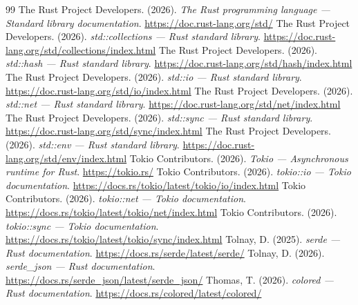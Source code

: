 \documentclass[11pt]{article}
\begin{document}
\renewcommand{\refname}{Referencias}
\begin{thebibliography}{99}
The Rust Project Developers. (2026). \textit{The Rust programming language --- Standard library documentation}. \url{https://doc.rust-lang.org/std/}
The Rust Project Developers. (2026). \textit{std::collections --- Rust standard library}. \url{https://doc.rust-lang.org/std/collections/index.html}
The Rust Project Developers. (2026). \textit{std::hash --- Rust standard library}. \url{https://doc.rust-lang.org/std/hash/index.html}
The Rust Project Developers. (2026). \textit{std::io --- Rust standard library}. \url{https://doc.rust-lang.org/std/io/index.html}
The Rust Project Developers. (2026). \textit{std::net --- Rust standard library}. \url{https://doc.rust-lang.org/std/net/index.html}
The Rust Project Developers. (2026). \textit{std::sync --- Rust standard library}. \url{https://doc.rust-lang.org/std/sync/index.html}
The Rust Project Developers. (2026). \textit{std::env --- Rust standard library}. \url{https://doc.rust-lang.org/std/env/index.html}
Tokio Contributors. (2026). \textit{Tokio --- Asynchronous runtime for Rust}. \url{https://tokio.rs/}
Tokio Contributors. (2026). \textit{tokio::io --- Tokio documentation}. \url{https://docs.rs/tokio/latest/tokio/io/index.html}
Tokio Contributors. (2026). \textit{tokio::net --- Tokio documentation}. \url{https://docs.rs/tokio/latest/tokio/net/index.html}
Tokio Contributors. (2026). \textit{tokio::sync --- Tokio documentation}. \url{https://docs.rs/tokio/latest/tokio/sync/index.html}
Tolnay, D. (2025). \textit{serde --- Rust documentation}. \url{https://docs.rs/serde/latest/serde/}
Tolnay, D. (2026). \textit{serde\_json --- Rust documentation}. \url{https://docs.rs/serde_json/latest/serde_json/}
Thomas, T. (2026). \textit{colored --- Rust documentation}. \url{https://docs.rs/colored/latest/colored/}
\end{thebibliography}
\end{document}
